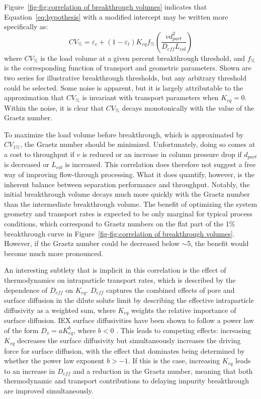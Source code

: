 \documentclass[preprint,review,12pt]{elsarticle}
\begin{document}
        Figure~\ref{fig-fig:correlation of breakthrough volumes} indicates that Equation~\ref{eq:hypothesis} with a modified intercept may be written more specifically as:
        \begin{equation} \label{eq:breakthrough volume correlation}
            CV_\% = \varepsilon_c + (1 - \varepsilon_t) K_{eq} f_\% \left( \frac{v d_{part}^2}{D_{eff} L_{col}} \right)
        \end{equation}
        where $CV_\%$ is the load volume at a given percent breakthrough threshold, and $f_\%$ is the corresponding function of transport and geometric parameters. Shown are two series for illustrative breakthrough thresholds, but any arbitrary threshold could be selected. Some noise is apparent, but it is largely attributable to the approximation that $CV_\%$ is invariant with transport parameters when $K_{eq} = 0$. Within the noise, it is clear that $CV_\%$ decays monotonically with the value of the Graetz number.

        To maximize the load volume before breakthrough, which is approximated by $CV_{1\%}$, the Graetz number should be minimized. Unfortunately, doing so comes at a cost to throughput if $v$ is reduced or an increase in column pressure drop if $d_{part}$ is decreased or $L_{col}$ is increased. This correlation does therefore not suggest a free way of improving flow-through processing. What it does quantify, however, is the inherent balance between separation performance and throughput. Notably, the initial breakthrough volume decays much more quickly with the Graetz number than the intermediate breakthrough volume. The benefit of optimizing the system geometry and transport rates is expected to be only marginal for typical process conditions, which correspond to Graetz numbers on the flat part of the 1\% breakthrough curve in Figure~\ref{fig-fig:correlation of breakthrough volumes}. However, if the Graetz number could be decreased below $\sim$5, the benefit would become much more pronounced.


    An interesting subtlety that is implicit in this correlation is the effect of thermodynamics on intraparticle transport rates, which is described by the dependence of $D_{eff}$ on $K_{eq}$. $D_{eff}$ captures the combined effects of pore and surface diffusion in the dilute solute limit by describing the effective intraparticle diffusivity as a weighted sum, where $K_{eq}$ weights the relative importance of surface diffusion. IEX surface diffusivities have been shown to follow a power law of the form $D_s = a K_{eq}^b$, where $b < 0$ \cite{Khanal7004}. This leads to competing effects: increasing $K_{eq}$ decreases the surface diffusivity but simultaneously increases the driving force for surface diffusion, with the effect that dominates being determined by whether the power law exponent $b > -1$. If this is the case, increasing $K_{eq}$ leads to an increase in $D_{eff}$ and a reduction in the Graetz number, meaning that both thermodynamic and transport contributions to delaying impurity breakthrough are improved simultaneously.
\end{document}
